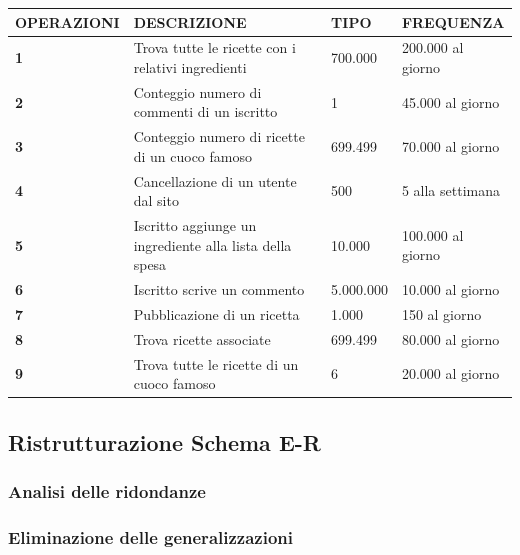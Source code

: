 \documentclass[12pt]{extarticle}
\begin{document}
\vspace{1cm}
    \begin{tabularx}{\textwidth}{X|X|X|X}
    \bfseries OPERAZIONI    & \bfseries DESCRIZIONE     & \bfseries TIPO & \bfseries FREQUENZA\\ 
    \hline\hline
    \bfseries 1     & Trova tutte le ricette con i relativi ingredienti         & 700.000       &   200.000 al giorno    \\ 
    \hline
    \bfseries 2     & Conteggio numero di commenti di un iscritto               & 1             &   45.000 al giorno \\
    \hline
    \bfseries 3     & Conteggio numero di ricette di un cuoco famoso            & 699.499       &   70.000 al giorno \\
    \hline
    \bfseries 4     & Cancellazione di un utente dal sito                       & 500           &   5 alla settimana \\
    \hline
    \bfseries 5     & Iscritto aggiunge un ingrediente alla lista della spesa   & 10.000        &   100.000 al giorno \\
    \hline
    \bfseries 6     & Iscritto scrive un commento                               & 5.000.000     &   10.000 al giorno \\
    \hline
    \bfseries 7     & Pubblicazione di un ricetta                               & 1.000         &   150 al giorno \\
    \hline
    \bfseries 8     & Trova ricette associate                                   & 699.499       &   80.000 al giorno\\
    \hline
    \bfseries 9     & Trova tutte le ricette di un cuoco famoso                 & 6             &   20.000 al giorno\\
    \hline
    \end{tabularx}
\vspace{1cm}

\subsection{Ristrutturazione Schema E-R}
\subsubsection{Analisi delle ridondanze}
\subsubsection{Eliminazione delle generalizzazioni}
\end{document}
